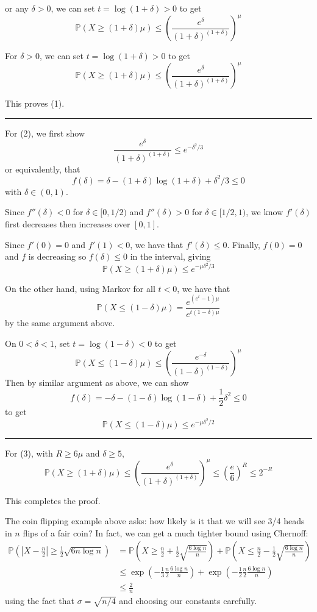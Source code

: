 \documentclass[12pt]{report}
\renewcommand{\P}{\mathbb{P}}
\newcommand{\abs}[1]{\left\vert #1 \right\vert}
\renewcommand{\div}{\vspace*{10pt}\hrule\vspace*{10pt}}
\newenvironment*{tbox}[2][gray]{
    \begin{tcolorbox}[
        parbox=false,
        colback=#1!5!white,
        colframe=#1!75!black,
        breakable,
        title={#2}
    ]}
    {\end{tcolorbox}}
\begin{document}
\begin{tbox}
For any $\delta > 0$, we can set $t = \log(1 + \delta) > 0$ to get
\[\P(X \geq (1 + \delta)\mu) \leq \left(\frac{e^{\delta}}{(1 + \delta)^{(1 + \delta)}}\right)^{\mu} \] 

For $\delta > 0$, we can set $t  =\log(1 + \delta) > 0$ to get 
\[\P(X \geq (1 + \delta)\mu) \leq \left(\frac{e^{\delta}}{(1+\delta)^{(1+\delta)}}\right)^{\mu}\] 

This proves (1).

\div

For (2), we first show 
\[\frac{e^{\delta}}{(1+ \delta)^{(1 + \delta)}} \leq e^{-\delta^2/3}\]
or equivalently, that
\[f(\delta) = \delta - (1 + \delta)\log(1 + \delta)+ \delta^2/3 \leq 0\]
with $\delta \in (0, 1)$. 

Since $f''(\delta) < 0$ for $\delta \in [0, 1/2)$ and $f''(\delta) > 0$ for $\delta \in [1/2, 1)$, we know $f'(\delta)$ first decreases then increases over $[0, 1]$. 

Since $f'(0) = 0$ and $f'(1) < 0$, we have that $f'(\delta) \leq 0$. Finally, $f(0) = 0$ and $f$ is decreasing so $f(\delta) \leq 0$ in the interval, giving 
\[\boxed{\P(X \geq (1 + \delta)\mu) \leq e^{-\mu \delta^2/3}}\] 


On the other hand, using Markov for all $t < 0$, we have that 
\[\P(X \leq (1- \delta)\mu) = \frac{e^{(e^{t} - 1)\mu}}{e^{t(1 - \delta)\mu}}\]
by the same argument above. 

On $0 < \delta < 1$, set $t = \log(1- \delta) < 0$ to get
\[\P(X \leq (1 - \delta)\mu) \leq \left(\frac{e^{-\delta}}{(1-\delta)^{(1-\delta)}}\right)^{\mu}\] 
Then by similar argument as above, we can show 
\[f(\delta) = -\delta - (1 - \delta) \log(1 - \delta) + \frac{1}{2}\delta^2 \leq 0\]
to get 
\[\boxed{\P(X \leq (1 - \delta)\mu) \leq e^{-\mu \delta^2/2}}\]

\hrule 

For (3), with $R \geq 6\mu$ and $\delta\geq 5$, 
\[\P(X \geq (1 +\delta)\mu) \leq \left(\frac{e^{\delta}}{(1+\delta)^{(1+\delta)}}\right)^{\mu} \leq \left(\frac{e}{6}\right)^R \leq 2^{-R}\] 

This completes the proof. 
\end{tbox}

The coin flipping example above asks: how likely is it that we will see 3/4 heads in $n$ flips of a fair coin? In fact, we can get a much tighter bound using Chernoff:
\begin{align*}
    \P\left(\abs{X - \frac{n}{2}} \geq \frac{1}{2} \sqrt{6n \log n}\right) &= \P\left(X \geq \frac{n}{2} + \frac{1}{2} \sqrt{\frac{6\log n}{n}}\right) + \P\left(X \leq \frac{n}{2} - \frac{1}{2} \sqrt{\frac{6\log n}{n}}\right)\\ 
    &\leq \exp\left(-\frac{1}{3} \frac{n}{2} \frac{6\log n}{n}\right) + \exp\left(-\frac{1}{2} \frac{n}{2} \frac{6\log n}{n}\right)\\
    &\leq \frac{2}{n} 
\end{align*}
using the fact that $\sigma = \sqrt{n/4}$ and choosing our constants carefully. 
\end{document}
